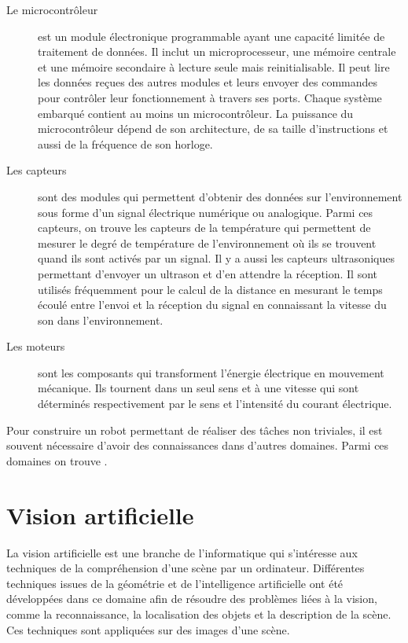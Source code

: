 \begin{description}
  \item[Le microcontrôleur] est un module électronique programmable ayant une
  capacité limitée de traitement de données. Il inclut un microprocesseur, une
  mémoire centrale et une mémoire secondaire à lecture seule mais reinitialisable.
  Il peut lire les données reçues des autres modules et leurs envoyer des commandes
  pour contrôler leur fonctionnement à travers ses ports. Chaque système embarqué
  contient au moins un microcontrôleur. La puissance du microcontrôleur
  dépend de son architecture, de sa taille d'instructions et aussi de la fréquence
  de son horloge.
  \item[Les capteurs] sont des modules qui permettent d'obtenir des données sur
  l'environnement sous forme d'un signal électrique numérique ou analogique.
  Parmi ces capteurs, on trouve les capteurs de la température qui permettent de
  mesurer le degré de température de l'environnement où ils se trouvent quand ils
  sont activés par un signal.
  Il y a aussi les capteurs ultrasoniques permettant d'envoyer un ultrason et
  d'en attendre la réception.
  Il sont utilisés fréquemment pour le calcul de la distance en mesurant le
  temps écoulé entre l'envoi et la réception du signal en connaissant la vitesse
  du son dans l'environnement.
  \item[Les moteurs] sont les composants qui transforment l'énergie électrique en
  mouvement mécanique. Ils tournent dans un seul sens et à une vitesse qui
  sont déterminés respectivement par le sens et l'intensité du courant électrique.
\end{description}

Pour construire un robot permettant de réaliser des tâches non triviales, il est
souvent nécessaire d'avoir des connaissances dans d'autres domaines. Parmi ces
domaines on trouve .

\section{Vision artificielle}

La vision artificielle est une branche de l'informatique qui s'intéresse aux
techniques de la compréhension d'une scène par un ordinateur. Différentes
techniques issues de la géométrie et de l'intelligence artificielle ont été
développées dans ce domaine afin de résoudre des problèmes liées à la vision,
comme la reconnaissance, la localisation des objets et la description de
la scène. Ces techniques sont appliquées sur des images d'une scène.

